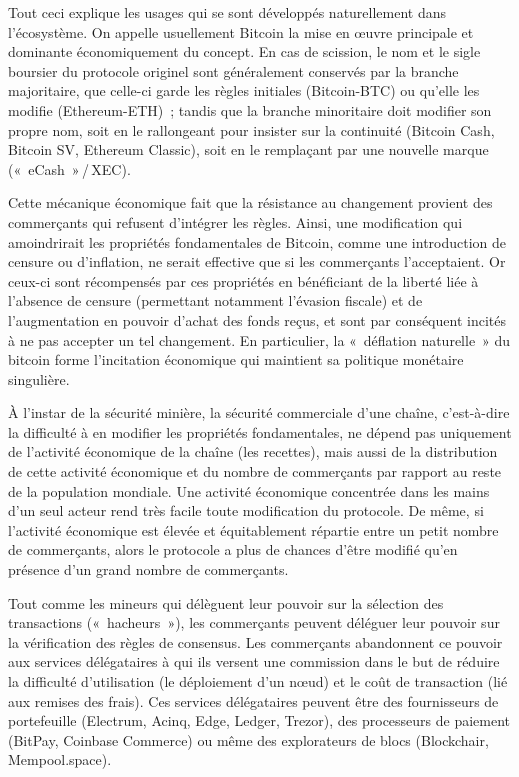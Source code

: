 Tout ceci explique les usages qui se sont développés naturellement dans l'écosystème. On appelle usuellement Bitcoin la mise en œuvre principale et dominante économiquement du concept. En cas de scission, le nom et le sigle boursier du protocole originel sont généralement conservés par la branche majoritaire, que celle-ci garde les règles initiales (Bitcoin-BTC) ou qu'elle les modifie (Ethereum-ETH)~; tandis que la branche minoritaire doit modifier son propre nom, soit en le rallongeant pour insister sur la continuité (Bitcoin Cash, Bitcoin SV, Ethereum Classic), soit en le remplaçant par une nouvelle marque («~eCash~»\,/\,XEC).

Cette mécanique économique fait que la résistance au changement provient des commerçants qui refusent d'intégrer les règles. Ainsi, une modification qui amoindrirait les propriétés fondamentales de Bitcoin, comme une introduction de censure ou d'inflation, ne serait effective que si les commerçants l'acceptaient. Or ceux-ci sont récompensés par ces propriétés en bénéficiant de la liberté liée à l'absence de censure (permettant notamment l'évasion fiscale) et de l'augmentation en pouvoir d'achat des fonds reçus, et sont par conséquent incités à ne pas accepter un tel changement. En particulier, la «~déflation naturelle~» du bitcoin forme l'incitation économique qui maintient sa politique monétaire singulière.

À l'instar de la sécurité minière, la sécurité commerciale d'une chaîne, c'est-à-dire la difficulté à en modifier les propriétés fondamentales, ne dépend pas uniquement de l'activité économique de la chaîne (les recettes), mais aussi de la distribution de cette activité économique et du nombre de commerçants par rapport au reste de la population mondiale. Une activité économique concentrée dans les mains d'un seul acteur rend très facile toute modification du protocole. De même, si l'activité économique est élevée et équitablement répartie entre un petit nombre de commerçants, alors le protocole a plus de chances d'être modifié qu'en présence d'un grand nombre de commerçants.

Tout comme les mineurs qui délèguent leur pouvoir sur la sélection des transactions («~hacheurs~»), les commerçants peuvent déléguer leur pouvoir sur la vérification des règles de consensus. Les commerçants abandonnent ce pouvoir aux services délégataires à qui ils versent une commission dans le but de réduire la difficulté d'utilisation (le déploiement d'un nœud) et le coût de transaction (lié aux remises des frais). Ces services délégataires peuvent être des fournisseurs de portefeuille (Electrum, Acinq, Edge, Ledger, Trezor), des processeurs de paiement (BitPay, Coinbase Commerce) ou même des explorateurs de blocs (Blockchair, Mempool.space).

